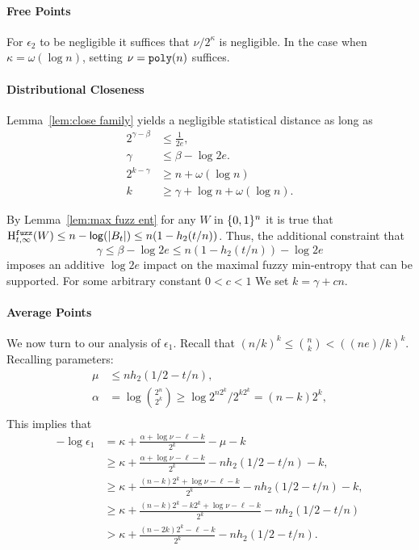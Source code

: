 \paragraph{Free Points}
For $\epsilon_2$ to be negligible it suffices that $\nu/2^\kappa$ is negligible.  In the case when $\kappa = \omega(\log{n})$, setting $\nu = \mathtt{poly}(n)$ suffices.
\paragraph{Distributional Closeness}
 Lemma~\ref{lem:close family} yields a negligible statistical distance as long as 
\begin{align*}
2^{\gamma - \beta} &\le \frac{1}{2e},\\
 \gamma &\le \beta -\log{2e}.\\
2^{k-\gamma}&\ge n+\omega(\log n)\\
k &\ge \gamma + \log{n+ \omega(\log{n})}.
\end{align*}


By Lemma~\ref{lem:max fuzz ent} for any $W$ in $\{0, 1\}^n$ it is true that $\mathrm{H}^{\mathtt{fuzz}}_{t,\infty}(W) \le n -\mathsf{log}\!\left(|B_t|\right) \le n(1-h_2(t/n))$.  Thus, the additional constraint that 
\[
\gamma \le \beta - \log{2e}
\le n(1-h_2(t/n)) - \log{2e}\] imposes an additive $\log{2e}$ impact on the maximal fuzzy min-entropy that can be supported. 
For some arbitrary constant $0<c < 1$ We set $k = \gamma + cn$. 

\paragraph{Average Points} 
We now turn to our analysis of $\epsilon_1$.  Recall that $(n/k)^k \le {n\choose k} < ((ne)/k)^k$.  Recalling parameters: 
\begin{align*}
\mu&\le nh_2(1/2-t/n),\\
\alpha &= \log{2^n\choose 2^k} \ge \log{2^{n2^k} /2^{k2^k}} = (n-k)2^k,\\
\end{align*}
This implies that 
\begin{align*}
-\log{\epsilon_1}&= \kappa+\frac{\alpha +\log{\nu}-\ell-k}{2^k} - \mu -k\\
&\ge  \kappa+\frac{\alpha +\log{\nu}-\ell-k}{2^k} - nh_2(1/2-t/n) - k,\\
&\ge  \kappa+\frac{(n-k)2^k +\log{\nu}-\ell-k}{2^k} - nh_2(1/2-t/n) - k,\\
&\ge  \kappa+\frac{(n-k)2^k-k2^{k} +\log{\nu}-\ell-k}{2^k} - nh_2(1/2-t/n)\\
&>  \kappa+\frac{(n-2k)2^k-\ell-k}{2^k} - nh_2(1/2-t/n) .
\end{align*}

